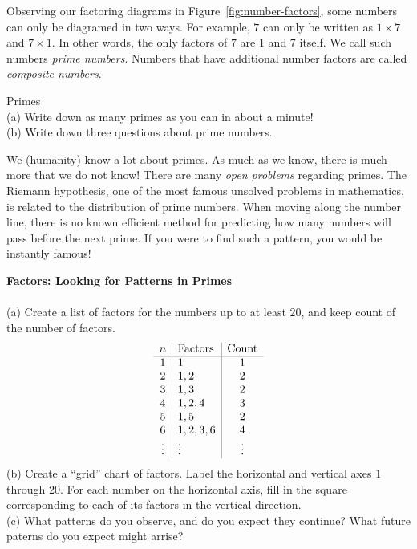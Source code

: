 \newpage 
Observing our factoring diagrams in Figure~\ref{fig:number-factors}, some numbers can only be diagramed in two ways.  For example, \(7\) can only be written as \(1 \times 7\) and \(7 \times 1\).  In other words, the only factors of \(7\) are \(1\) and \(7\) itself.  We call such numbers \emph{prime numbers}.  Numbers that have additional number factors are called \emph{composite numbers}.   
\vspace{3mm}
\begin{exercise}
	Primes
	\\ \hspace*{15mm} (a) Write down as many primes as you can in about a minute!
	\\ \hspace*{15mm} (b) Write down three questions about prime numbers. 
	\label{ex:primelist}
\end{exercise}
\vspace{5mm}
We (humanity) know a lot about primes. 
As much as we know, there is much more that we do not know!  There are many \emph{open problems} regarding primes.  The Riemann hypothesis, one of the most famous unsolved problems in mathematics, is related to the distribution of prime numbers.  When moving along the number line, there is no known efficient method for predicting how many numbers will pass before the next prime.  If you were to find such a pattern, you would be instantly famous!  
\vspace{3mm}
\begin{exercise} \textbf{Factors: Looking for Patterns in Primes}
\\ \\
(a) Create a list of factors for the numbers up to at least \(20\), and keep count of the number of factors.  
\[ 
	\begin{array}{c | l | c}
		n & \text{Factors} & \text{Count} \\ \hline 		 
		1 & 1  & 1\\ 
		2 & 1, 2 & 2\\ 
		3 & 1, 3 & 2\\ 
		4 & 1, 2, 4 & 3\\
		5 & 1, 5 & 2 \\
		6 & 1, 2, 3, 6 & 4 \\ 
		\vdots & \vdots & \vdots  \\
	\end{array}
\]
(b) Create a ``grid'' chart of factors.  Label the horizontal and vertical axes \(1\) through \(20\).  For each number on the horizontal axis, fill in the square corresponding to each of its factors in the vertical direction.  
\\ 
(c) What patterns do you observe, and do you expect they continue?  What future paterns do you expect might arrise?
\label{ex:primepatterns}
\end{exercise}
